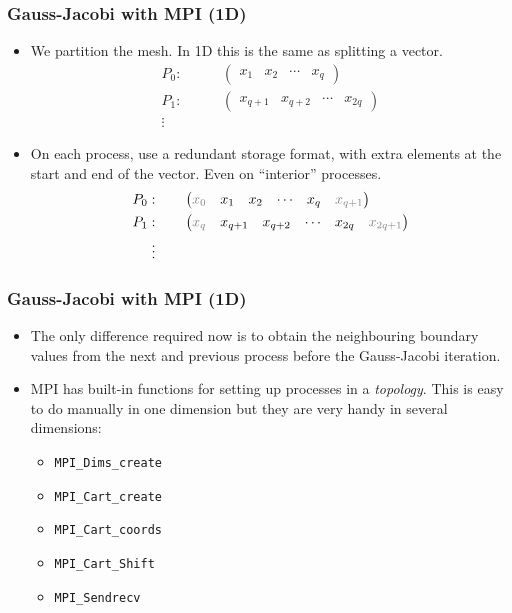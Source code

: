 \begin{frame}
  \frametitle{Gauss-Jacobi with MPI (1D)}
  \begin{itemize}
  \item We partition the mesh. In 1D this is the same as splitting a vector.
    \begin{align*}
      P_0: &\qquad \begin{pmatrix} x_1 & x_2 & \cdots & x_q \end{pmatrix} \\
      P_1: &\qquad \begin{pmatrix} x_{q+1} & x_{q+2} & \cdots & x_{2q} \end{pmatrix} \\
      \vdots &
    \end{align*}
  \item On each process, use a redundant storage format, with extra elements at
    the start and end of the vector. Even on ``interior'' processes.
    \begin{align*}
      P_0: &\qquad \begin{pmatrix}
        {\color{gray} x_0} & x_1 & x_2 & \cdots & x_q & {\color{gray} x_{q+1}}
      \end{pmatrix} \\
      P_1: &\qquad \begin{pmatrix}
        {\color{gray} x_q} & x_{q+1} & x_{q+2} & \cdots & x_{2q} & {\color{gray} x_{2q+1}}
      \end{pmatrix} \\
      \vdots &
    \end{align*}
  \end{itemize}
\end{frame}

\begin{frame}
  \frametitle{Gauss-Jacobi with MPI (1D)}
  \begin{itemize}
  \item The only difference required now is to obtain the neighbouring boundary
    values from the next and previous process before the Gauss-Jacobi iteration.
  \item MPI has built-in functions for setting up processes in a
    \emph{topology}. This is easy to do manually in one dimension but they are
    very handy in several dimensions:
    \begin{itemize}
    \item \texttt{MPI\_Dims\_create}
    \item \texttt{MPI\_Cart\_create}
    \item \texttt{MPI\_Cart\_coords}
    \item \texttt{MPI\_Cart\_Shift}
    \item \texttt{MPI\_Sendrecv}
    \end{itemize}
  \end{itemize}
\end{frame}

